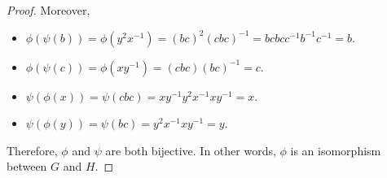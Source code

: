 \documentclass[12pt, psamsfonts]{amsart}
\theoremstyle{definition}
\theoremstyle{remark}
\numberwithin{equation}{section}
\begin{document}
\begin{proof}
  Moreover,

  \begin{itemize}
    \item
      $\phi(\psi(b)) = \phi(y^2x^{-1}) = (bc)^2(cbc)^{-1} = bcbcc^{-1}b^{-1}c^{-1} = b$.
    \item
      $\phi(\psi(c)) = \phi(xy^{-1}) = (cbc)(bc)^{-1} = c$.
    \item
      $\psi(\phi(x)) = \psi(cbc) = xy^{-1}y^2x^{-1}xy^{-1} = x$.
    \item
      $\psi(\phi(y)) = \psi(bc) = y^2x^{-1}xy^{-1} = y$.
  \end{itemize}

  Therefore, $\phi$ and $\psi$ are both bijective.
  In other words, $\phi$ is an isomorphism between $G$ and $H$.
\end{proof}
\end{document}
